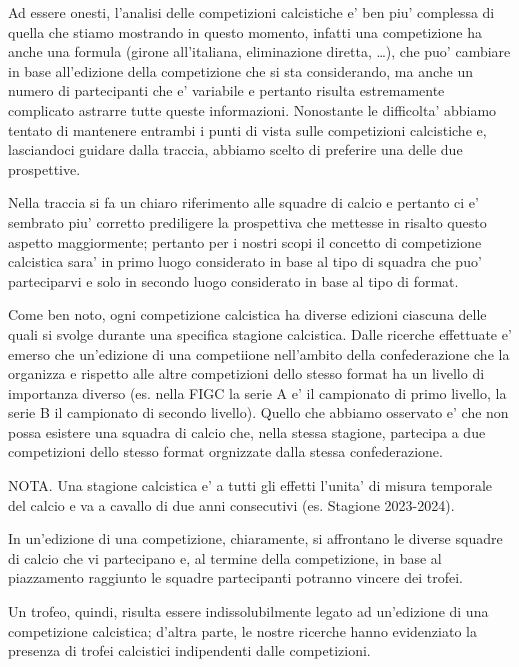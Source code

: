 Ad essere onesti, l'analisi delle competizioni calcistiche e' ben piu' complessa di quella
che stiamo mostrando in questo momento, infatti una competizione ha anche una formula
(girone all'italiana, eliminazione diretta, \dots),
che puo' cambiare in base all'edizione della competizione che si sta considerando,
ma anche un numero di partecipanti che e' variabile e pertanto risulta estremamente
complicato astrarre tutte queste informazioni.
Nonostante le difficolta' abbiamo tentato di mantenere entrambi i punti di vista sulle
competizioni calcistiche e, lasciandoci guidare dalla traccia, abbiamo scelto di preferire una
delle due prospettive.

Nella traccia si fa un chiaro riferimento alle squadre di calcio e pertanto ci e' sembrato
piu' corretto prediligere la prospettiva che mettesse in risalto questo aspetto maggiormente;
pertanto per i nostri scopi il concetto di competizione calcistica sara' in primo luogo
considerato in base al tipo di squadra che puo' parteciparvi e solo in secondo luogo
considerato in base al tipo di format.

\bigskip
\bigskip

Come ben noto, ogni competizione calcistica ha diverse edizioni ciascuna delle quali
si svolge durante una specifica stagione calcistica.
Dalle ricerche effettuate e' emerso che un'edizione di una competiione nell'ambito della
confederazione che la organizza e rispetto alle altre competizioni dello stesso format
ha un livello di importanza diverso (es. nella FIGC la serie A e' il campionato di primo
livello, la serie B il campionato di secondo livello).
Quello che abbiamo osservato e' che non possa esistere una squadra di calcio che, nella
stessa stagione, partecipa a due competizioni dello stesso format orgnizzate dalla stessa
confederazione.

NOTA. Una stagione calcistica e' a tutti gli effetti l'unita' di misura temporale del calcio
e va a cavallo di due anni consecutivi (es. Stagione 2023-2024).

In un'edizione di una competizione, chiaramente, si affrontano le diverse squadre di calcio
che vi partecipano e, al termine della competizione, in base al piazzamento raggiunto le
squadre partecipanti potranno vincere dei trofei.

Un trofeo, quindi, risulta essere indissolubilmente legato ad un'edizione di una competizione
calcistica; d'altra parte, le nostre ricerche hanno evidenziato la presenza di trofei calcistici
indipendenti dalle competizioni.

